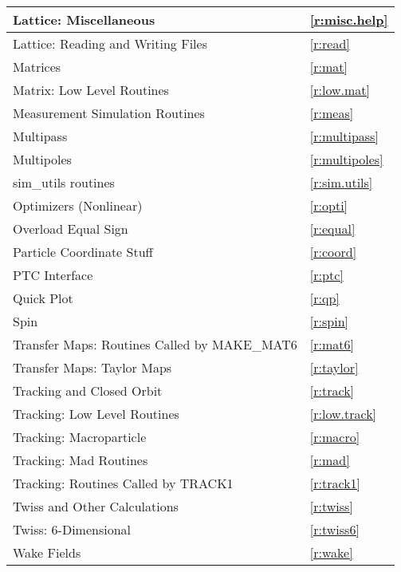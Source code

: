 \begin{center}
\begin{tabular}{|l|l|}
  Lattice: Miscellaneous                      & \ref{r:misc.help}      \\ \hline
  Lattice: Reading and Writing Files          & \ref{r:read}           \\ \hline
  Matrices                                    & \ref{r:mat}            \\ \hline
  Matrix: Low Level Routines                  & \ref{r:low.mat}        \\ \hline
  Measurement Simulation Routines             & \ref{r:meas}           \\ \hline
  Multipass                                   & \ref{r:multipass}      \\ \hline
  Multipoles                                  & \ref{r:multipoles}     \\ \hline
  sim_utils routines                          & \ref{r:sim.utils}       \\ \hline
  Optimizers (Nonlinear)                      & \ref{r:opti}           \\ \hline
  Overload Equal Sign                         & \ref{r:equal}          \\ \hline
  Particle Coordinate Stuff                   & \ref{r:coord}          \\ \hline
  PTC Interface                               & \ref{r:ptc}            \\ \hline
  Quick Plot                                  & \ref{r:qp}             \\ \hline
  Spin                                        & \ref{r:spin}           \\ \hline
  Transfer Maps: Routines Called by MAKE_MAT6 & \ref{r:mat6}           \\ \hline
  Transfer Maps: Taylor Maps                  & \ref{r:taylor}         \\ \hline
  Tracking and Closed Orbit                   & \ref{r:track}          \\ \hline
  Tracking: Low Level Routines                & \ref{r:low.track}      \\ \hline
  Tracking: Macroparticle                     & \ref{r:macro}          \\ \hline
  Tracking: Mad Routines                      & \ref{r:mad}            \\ \hline
  Tracking: Routines Called by TRACK1         & \ref{r:track1}         \\ \hline
  Twiss and Other Calculations                & \ref{r:twiss}          \\ \hline
  Twiss: 6-Dimensional                        & \ref{r:twiss6}         \\ \hline
  Wake Fields                                 & \ref{r:wake}           \\ \hline
\end{tabular}
\end{center}
\toffset

